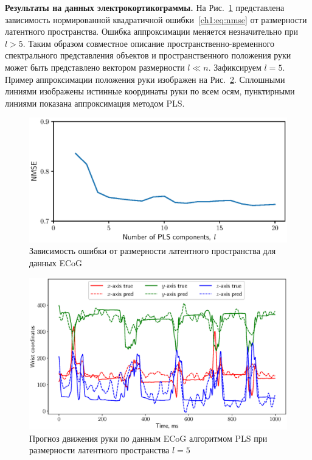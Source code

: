 \textbf{Результаты на данных электрокортикограммы.}
На Рис.~\ref{ch1:fig:ecog_n_comp} представлена зависимость нормированной квадратичной ошибки~\eqref{ch1:eq:nmse} от размерности латентного пространства. Ошибка аппроксимации меняется незначительно при $l > 5$.
Таким образом совместное описание пространственно-временного спектрального представления объектов и пространственного положения руки может быть представлено вектором размерности $l \ll n$.
Зафиксируем $l = 5$. 
Пример аппроксимации положения руки изображен на Рис.~\ref{ch1:fig:ecog_prediction}. 
Сплошными линиями изображены истинные координаты руки по всем осям, пунктирными линиями показана аппроксимация методом PLS.
 
\begin{figure}[ht]
	\centering
	\includegraphics[width=0.75\linewidth]{figs/ch1/ecog_n_comp}	
	\caption{Зависимость ошибки от размерности латентного пространства для данных ECoG}
	\label{ch1:fig:ecog_n_comp}
\end{figure}

\begin{figure}[ht]
	\centering
	\includegraphics[width=\textwidth]{figs/ch1/ecog_prediction}
	\caption{Прогноз движения руки по данным ECoG алгоритмом PLS при размерности латентного пространства $l=5$}
	\label{ch1:fig:ecog_prediction}
\end{figure}

